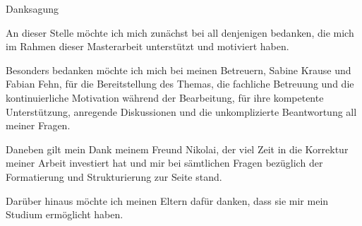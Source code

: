 \thispagestyle{empty}

\vspace*{2cm}

\begin{center}
{ Danksagung}
\end{center}

\vspace{1cm}


An dieser Stelle möchte ich mich zunächst bei all denjenigen bedanken, die mich im Rahmen dieser Masterarbeit unterstützt und motiviert haben.

Besonders bedanken möchte ich mich bei meinen Betreuern, Sabine Krause und Fabian Fehn, für die Bereitstellung des Themas, die fachliche Betreuung und die kontinuierliche Motivation während der Bearbeitung, für ihre kompetente Unterstützung, anregende Diskussionen und die unkomplizierte Beantwortung all meiner Fragen. 

Daneben gilt mein Dank meinem Freund Nikolai, der viel Zeit in die Korrektur meiner Arbeit investiert hat und mir bei sämtlichen Fragen bezüglich der Formatierung und Strukturierung zur Seite stand.

Darüber hinaus möchte ich meinen Eltern dafür danken, dass sie mir mein Studium ermöglicht haben. 

\cleardoublepage{}
